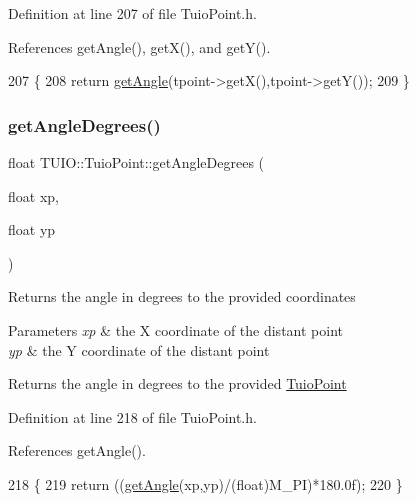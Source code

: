 Definition at line 207 of file Tuio\+Point.\+h.



References get\+Angle(), get\+X(), and get\+Y().


\begin{DoxyCode}
207                                           \{
208             \textcolor{keywordflow}{return} \hyperlink{class_t_u_i_o_1_1_tuio_point_ad4ca45ad0fdccc6f55b5af79189e7872}{getAngle}(tpoint->getX(),tpoint->getY());
209         \}
\end{DoxyCode}
\mbox{\label{class_t_u_i_o_1_1_tuio_point_a96316f957c35019a21b0a1e4cc749ed7}} 
\subsubsection{\texorpdfstring{get\+Angle\+Degrees()}{getAngleDegrees()}\hspace{0.1cm}{\footnotesize\ttfamily [1/2]}}
{\footnotesize\ttfamily float T\+U\+I\+O\+::\+Tuio\+Point\+::get\+Angle\+Degrees (\begin{DoxyParamCaption}\item[{float}]{xp,  }\item[{float}]{yp }\end{DoxyParamCaption})\hspace{0.3cm}{\ttfamily [inline]}}

Returns the angle in degrees to the provided coordinates


\begin{DoxyParams}{Parameters}
{\em xp} & the X coordinate of the distant point \\
\hline
{\em yp} & the Y coordinate of the distant point \\
\hline
\end{DoxyParams}
\begin{DoxyReturn}{Returns}
the angle in degrees to the provided \hyperlink{class_t_u_i_o_1_1_tuio_point}{Tuio\+Point} 
\end{DoxyReturn}


Definition at line 218 of file Tuio\+Point.\+h.



References get\+Angle().


\begin{DoxyCode}
218                                                   \{
219             \textcolor{keywordflow}{return} ((\hyperlink{class_t_u_i_o_1_1_tuio_point_ad4ca45ad0fdccc6f55b5af79189e7872}{getAngle}(xp,yp)/(\textcolor{keywordtype}{float})M\_PI)*180.0f);
220         \}
\end{DoxyCode}
\mbox{\label{class_t_u_i_o_1_1_tuio_point_af1ba5c843255cd17a1c2f4dc38cb519b}} 
